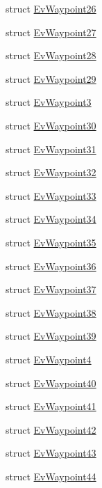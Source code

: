 \begin{DoxyCompactItemize}
struct \hyperlink{structmove__base__z__client_1_1EvWaypoint26}{Ev\+Waypoint26}
\item 
struct \hyperlink{structmove__base__z__client_1_1EvWaypoint27}{Ev\+Waypoint27}
\item 
struct \hyperlink{structmove__base__z__client_1_1EvWaypoint28}{Ev\+Waypoint28}
\item 
struct \hyperlink{structmove__base__z__client_1_1EvWaypoint29}{Ev\+Waypoint29}
\item 
struct \hyperlink{structmove__base__z__client_1_1EvWaypoint3}{Ev\+Waypoint3}
\item 
struct \hyperlink{structmove__base__z__client_1_1EvWaypoint30}{Ev\+Waypoint30}
\item 
struct \hyperlink{structmove__base__z__client_1_1EvWaypoint31}{Ev\+Waypoint31}
\item 
struct \hyperlink{structmove__base__z__client_1_1EvWaypoint32}{Ev\+Waypoint32}
\item 
struct \hyperlink{structmove__base__z__client_1_1EvWaypoint33}{Ev\+Waypoint33}
\item 
struct \hyperlink{structmove__base__z__client_1_1EvWaypoint34}{Ev\+Waypoint34}
\item 
struct \hyperlink{structmove__base__z__client_1_1EvWaypoint35}{Ev\+Waypoint35}
\item 
struct \hyperlink{structmove__base__z__client_1_1EvWaypoint36}{Ev\+Waypoint36}
\item 
struct \hyperlink{structmove__base__z__client_1_1EvWaypoint37}{Ev\+Waypoint37}
\item 
struct \hyperlink{structmove__base__z__client_1_1EvWaypoint38}{Ev\+Waypoint38}
\item 
struct \hyperlink{structmove__base__z__client_1_1EvWaypoint39}{Ev\+Waypoint39}
\item 
struct \hyperlink{structmove__base__z__client_1_1EvWaypoint4}{Ev\+Waypoint4}
\item 
struct \hyperlink{structmove__base__z__client_1_1EvWaypoint40}{Ev\+Waypoint40}
\item 
struct \hyperlink{structmove__base__z__client_1_1EvWaypoint41}{Ev\+Waypoint41}
\item 
struct \hyperlink{structmove__base__z__client_1_1EvWaypoint42}{Ev\+Waypoint42}
\item 
struct \hyperlink{structmove__base__z__client_1_1EvWaypoint43}{Ev\+Waypoint43}
\item 
struct \hyperlink{structmove__base__z__client_1_1EvWaypoint44}{Ev\+Waypoint44}
\item 

\end{DoxyCompactItemize}
